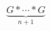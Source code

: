 \documentclass[preview]{standalone}
\begin{document}
\begin{align*}
\underbrace{G\ast \cdots\ast G}_{n+1}
\end{align*}
\end{document}
